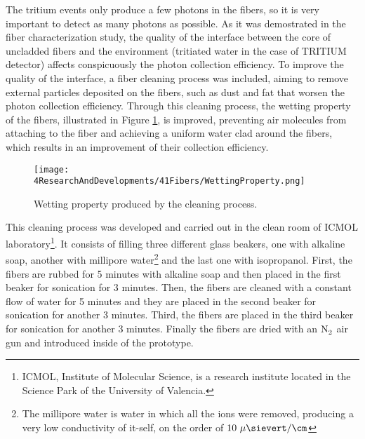 
The tritium events only produce a few photons in the fibers, so it is very important to detect as many photons as possible. As it was demostrated in the fiber characterization study, the quality of the interface between the core of uncladded fibers and the environment (tritiated water in the case of TRITIUM detector) affects conspicuously the photon collection efficiency. To improve the quality of the interface, a fiber cleaning process was included, aiming to remove external particles deposited on the fibers, such as dust and fat that worsen the photon collection efficiency.  Through this cleaning process, the wetting property of the fibers, illustrated in Figure \ref{fig:WettingProperty}, is improved, preventing air molecules from attaching to the fiber and achieving a uniform water clad around the fibers, which results in an improvement of their collection efficiency. 


\begin{figure}[h]
\centering
\texttt{[image: 4ResearchAndDevelopments/41Fibers/WettingProperty.png]}
\caption{Wetting property produced by the cleaning process. \cite{WettingProperty}\label{fig:WettingProperty}}
\end{figure}


This cleaning process  was developed and carried out in the clean room of ICMOL laboratory\footnote{ICMOL, Institute of Molecular Science, is a research institute located in the Science Park of the University of Valencia.}. It consists of filling three different glass beakers, one with alkaline soap, another with millipore water\footnote{The millipore water is water in which all the ions were removed, producing a very low conductivity of it-self, on the order of $10~\mu\sievert/\cm$} and the last one with isopropanol. First, the fibers are rubbed for 5 minutes with alkaline soap and then placed in the first beaker for sonication for 3 minutes. Then, the fibers are cleaned with a constant flow of water for 5 minutes and they are placed in the second beaker for sonication for another 3 minutes. Third, the fibers are placed in the third beaker for sonication for another 3 minutes. Finally the fibers are dried with an $\ce{N_2}$ air gun and introduced inside of the prototype.

